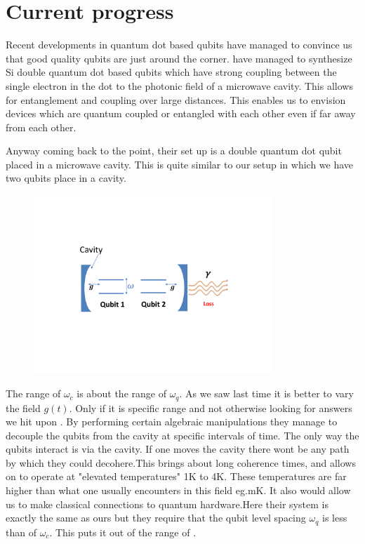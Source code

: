\chapter{Current progress}
Recent developments in quantum dot based qubits have managed to convince us that good quality qubits are just around the corner. \cite{petta} have managed to synthesize Si double quantum dot based qubits which have strong coupling between the single electron in the dot to the photonic field of a microwave cavity. This allows for entanglement and coupling over large distances. This enables us to envision devices which are quantum coupled or entangled with each other even if far away from each other. 
\par
Anyway coming back to the point, their set up is a double quantum dot qubit placed in a microwave cavity. This is quite similar to our setup in which we have two qubits place in a cavity.\\ 
\begin{figure}
\centering
\includegraphics[width=0.8\textwidth]{Figr1a} 
\end{figure}
\par
The range of $\omega_{c}$ is about the range of $\omega_{q}$.  As we saw last time it is better to vary the field $g(t)$. Only if it is specific range and not otherwise looking for answers we hit upon \cite{hot_gates}. By performing certain algebraic manipulations they manage to decouple the qubits from the cavity at specific intervals of time. The only way the qubits interact is via the cavity. If one moves the cavity there wont be any path by which they could decohere.This brings about long coherence times, and allows on to operate at "elevated temperatures" 1K to 4K. These temperatures are far higher than what one usually encounters in this field eg.mK. It also would allow us to make classical connections to quantum hardware.Here their system is exactly the same as ours but they require that the qubit level spacing $\omega_{q}$ is less than of $\omega_{c}$. This puts it out of the range of \cite{petta}.
